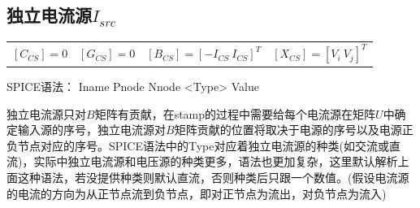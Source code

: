 \documentclass[12pt]{article}
\begin{document}
\subsection{独立电流源$I_{src}$}
\begin{table}[H]
  \centering
  \renewcommand\arraystretch{0.5}
  \begin{tabular}{cccc}
  $\left[C_{CS}\right]=0$ & 
  $\left[G_{CS}\right]=0$ & 
  $\left[B_{CS}\right]=\left[ -I_{CS} \ I_{CS} \right]^T$ & 
  $\left[X_{CS}\right]=\left[ V_{i} \ V_{j} \right]^T$ \\
  \end{tabular}
\end{table}
\qquad SPICE语法： Iname Pnode Nnode <Type> Value\par
\qquad  独立电流源只对$B$矩阵有贡献，在stamp的过程中需要给每个电流源在矩阵$U$中确定输入源的序号，独立电流源对$B$矩阵贡献的位置将取决于电源的序号以及电源正负节点对应的序号。SPICE语法中的Type对应着独立电流源的种类(如交流或直流)，实际中独立电流源和电压源的种类更多，语法也更加复杂，这里默认解析上面这种语法，若没提供种类则默认直流，否则种类后只跟一个数值。(假设电流源的电流的方向为从正节点流到负节点，即对正节点为流出，对负节点为流入)\par
\end{document}
